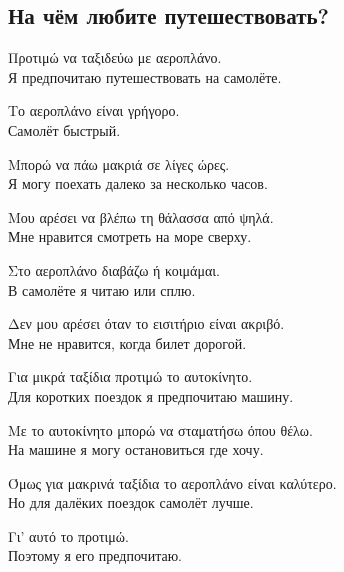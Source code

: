 \documentclass[12pt]{article}
\newcommand{\my}[1]{\textcolor{gray!80!white}{#1}}
\newenvironment{page}{\clearpage\normalsize\null\vfill}{\vfill\null}
\newenvironment{textblock}{\begin{minipage}{\textwidth}}{\end{minipage}\smallskip}
\begin{document}
	\begin{page}
		\subsection{На чём любите путешествовать?}
		\small
		\begin{textblock}
			Προτιμώ να ταξιδεύω με αεροπλάνο.\\
			\my{Я предпочитаю путешествовать на самолёте.}
			
			Το αεροπλάνο είναι γρήγορο.\\
			\my{Самолёт быстрый.}
			
			Μπορώ να πάω μακριά σε λίγες ώρες.\\
			\my{Я могу поехать далеко за несколько часов.}
			
			Μου αρέσει να βλέπω τη θάλασσα από ψηλά.\\
			\my{Мне нравится смотреть на море сверху.}
			
			Στο αεροπλάνο διαβάζω ή κοιμάμαι.\\
			\my{В самолёте я читаю или сплю.}
			
			Δεν μου αρέσει όταν το εισιτήριο είναι ακριβό.\\
			\my{Мне не нравится, когда билет дорогой.}
			
			Για μικρά ταξίδια προτιμώ το αυτοκίνητο.\\
			\my{Для коротких поездок я предпочитаю машину.}
			
			Με το αυτοκίνητο μπορώ να σταματήσω όπου θέλω.\\
			\my{На машине я могу остановиться где хочу.}
			
			Όμως για μακρινά ταξίδια το αεροπλάνο είναι καλύτερο.\\
			\my{Но для далёких поездок самолёт лучше.}
			
			Γι’ αυτό το προτιμώ.\\
			\my{Поэтому я его предпочитаю.}
		\end{textblock}
	\end{page}
	
\end{document}
